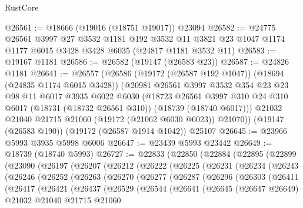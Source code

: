 \begin{lexlean}{RustCore}
\begin{coremodule}
@26561 := @18666 (@19016 (@18751 @19017)) @23094
@26582 := @24775
    @26561
    @3997
    @27
    @3532
    @1181
    @192
    @3532
    @11
    @3821
    @23
    @1047
    @1174
    @1177
    @6015
    @3428
    @3428
    @6035
    (@24817 @1181 @3532 @11)
@26583 := @19167 @1181
@26586 := @26582 (@19147 (@26583 @23))
@26587 := @24826 @1181
@26641 := @26557
    (@26586
      (@19172 (@26587 @192 @1047))
      (@18694 (@24835 @1174 @6015 @3428))
      (@20981
        @26561
        @3997
        @3532
        @354
        @23
        @23
        @98
        @11
        @6017
        @3935
        @6022
        @6030
        (@18723
          @26561
          @3997
          @310
          @24
          @310
          @6017
          (@18731 (@18732 @26561 @310))
          (@18739 (@18740 @6017)))
        @21032
        @21040
        @21715
        @21060
        (@19172 (@21062 @6030 @6023))
        @21070))
    (@19147 (@26583 @190))
    (@19172 (@26587 @1914 @1042))
    @25107
@26645 := @23966 @5993 @3935 @5998 @6006
@26647 := @23439 @5993 @23442
@26649 := @18739 (@18740 @5993)
@26727 := @22833
    (@22850
      (@22884
        (@22895
          (@22899
            (@23090
              (@26197
                (@26207
                  (@26212
                    (@26222
                      (@26225
                        (@26231
                          (@26234
                            (@26243
                              (@26246
                                (@26252
                                  (@26263
                                    (@26270
                                      (@26277
                                        (@26287
                                          (@26296
                                            (@26303
                                              (@26411
                                                (@26417
                                                  (@26421
                                                    (@26437
                                                      (@26529
                                                        (@26544
                                                          (@26641
                                                            (@26645
                                                              (@26647 @26649)
                                                              @21032
                                                              @21040
                                                              @21715
                                                              @21060

\end{coremodule}
\end{lexlean}
